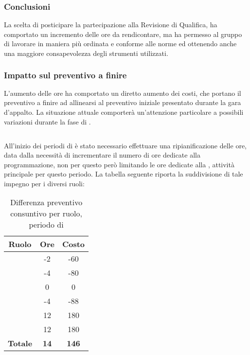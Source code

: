 \subsubsection{Conclusioni}
La scelta di posticipare la partecipazione alla Revisione di Qualifica, ha comportato un incremento delle ore da rendicontare, ma ha permesso al gruppo di lavorare in maniera più ordinata e conforme alle norme ed ottenendo anche una maggiore consapevolezza degli strumenti utilizzati.

\subsubsection{Impatto sul preventivo a finire}
L'aumento delle ore ha comportato un diretto aumento dei costi, che portano il preventivo a finire ad allinearsi al preventivo iniziale presentato durante la gara d'appalto.
La situazione attuale comporterà un'attenzione particolare a possibili variazioni durante la fase di \VV{}.

\subsection{\VV{}}
All'inizio dei periodi di \VV{} è stato necessario effettuare una ripianificazione delle ore, data dalla necessità di incrementare il numero di ore dedicate alla programmazione, non per questo però limitando le ore dedicate alla \VV{}, attività principale per questo periodo. La tabella seguente riporta la suddivisione di tale impegno per i diversi ruoli:
\begin{table}[H]
	\centering
	\begin{tabular}{|c|c|c|}
		\hline
		\textbf{Ruolo} &
		\textbf{Ore} &
		\textbf{Costo} \\
		\hline
		\Responsabile & -2 & -60\\
		\hline
		\Amministratore & -4 & -80\\
		\hline
		\Analista & 0 & 0\\
		\hline
		\Progettista & -4 & -88 \\
		\hline
		\Verificatore & 12 & 180 \\
		\hline
		\Programmatore & 12 & 180 \\
		\hline
		\textbf{Totale} & \textbf{14} & \textbf{146} \\
		\hline
	\end{tabular}
	\caption{Differenza preventivo consuntivo per ruolo, periodo di \VV}
\end{table}

